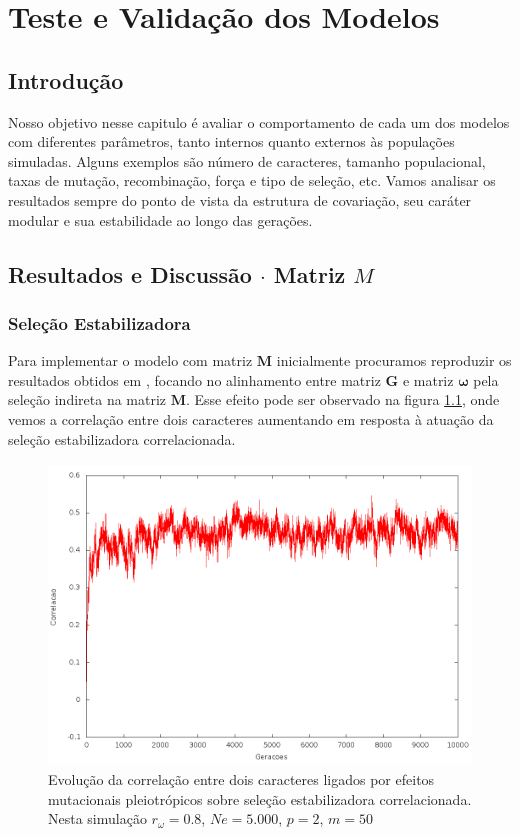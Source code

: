 \pagestyle{empty}
\cleardoublepage
\pagestyle{fancy}
\chapter{Teste e Validação dos Modelos}\label{cap3}

\section{Introdução}

Nosso objetivo nesse capitulo é avaliar o comportamento de cada um dos
modelos com diferentes parâmetros, tanto internos quanto
externos às populações simuladas.
Alguns exemplos são número de caracteres, tamanho populacional, taxas de
mutação, recombinação, força e tipo de seleção, etc. 
Vamos analisar os resultados sempre do ponto de vista da estrutura de
covariação, seu caráter modular e sua estabilidade ao longo das
gerações.

\section{Resultados e Discussão $\cdot$ Matriz $M$}\label{cap3:ModelM}

\subsection{Seleção Estabilizadora}

Para implementar o modelo com matriz $\mathbf{M}$ inicialmente procuramos
reproduzir os resultados obtidos em \cite{Jones2007}, focando no
alinhamento entre matriz $\mathbf{G}$ e matriz $\pmb{\omega}$ pela seleção indireta na
matriz $\mathbf{M}$. 
Esse efeito pode ser observado na figura \ref{jones2tracos}, onde vemos
a correlação entre dois caracteres aumentando em resposta à atuação da
seleção estabilizadora correlacionada.  

\begin{figure}[htbp]
    \centering
    \includegraphics[width=150mm, height=80mm]{figuras/jones2tracos.png}
    \caption{Evolução da correlação entre dois caracteres ligados por efeitos
        mutacionais pleiotrópicos sobre seleção estabilizadora correlacionada.
    Nesta simulação $r_\omega=0.8$, $Ne=5.000$, $p=2$, $m=50$}
    \label{jones2tracos}
\end{figure}

